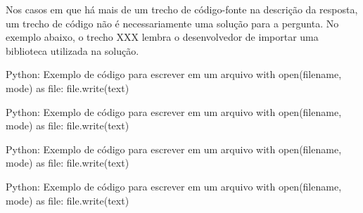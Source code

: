 Nos casos em que há mais de um trecho de código-fonte na descrição da resposta, um trecho de código não é necessariamente uma solução para a pergunta. No exemplo abaixo, o trecho XXX lembra o desenvolvedor de importar uma biblioteca utilizada na solução.

\begin{tcolorbox}[colframe=orange!75!black,colback=white,fonttitle=\bfseries,adjusted title=\large{ My very long title text}]
\begin{mypython}{Python: Exemplo de código para escrever em um arquivo}
with open(filename, mode) as file:
    file.write(text)
\end{mypython}
\begin{mypython}{Python: Exemplo de código para escrever em um arquivo}
with open(filename, mode) as file:
    file.write(text)
\end{mypython}
\begin{mypython}{Python: Exemplo de código para escrever em um arquivo}
with open(filename, mode) as file:
    file.write(text)
\end{mypython}
\begin{mypython}{Python: Exemplo de código para escrever em um arquivo}
with open(filename, mode) as file:
    file.write(text)
\end{mypython}
\end{tcolorbox}





